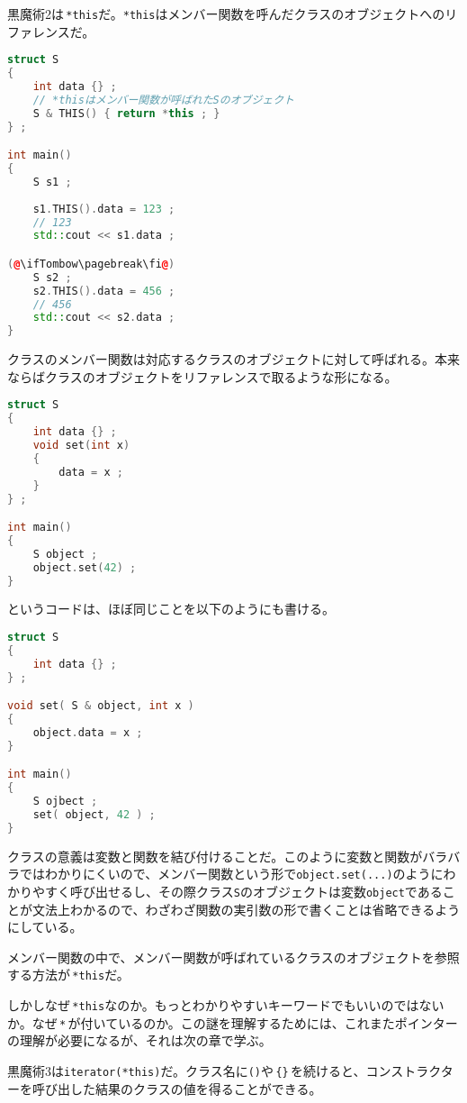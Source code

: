 黒魔術2は\,\texttt{*this}だ。\texttt{*this}はメンバー関数を呼んだクラスのオブジェクトへのリファレンスだ。

\begin{lstlisting}[language={C++}]
struct S
{
    int data {} ;
    // *thisはメンバー関数が呼ばれたSのオブジェクト
    S & THIS() { return *this ; } 
} ;

int main()
{
    S s1 ;
    
    s1.THIS().data = 123 ;
    // 123
    std::cout << s1.data ;

(@\ifTombow\pagebreak\fi@)
    S s2 ;
    s2.THIS().data = 456 ;
    // 456
    std::cout << s2.data ;
}
\end{lstlisting}

クラスのメンバー関数は対応するクラスのオブジェクトに対して呼ばれる。本来ならばクラスのオブジェクトをリファレンスで取るような形になる。

\begin{lstlisting}[language={C++}]
struct S
{
    int data {} ;
    void set(int x)
    {
        data = x ;
    }
} ;

int main()
{
    S object ;
    object.set(42) ;
}
\end{lstlisting}
というコードは、ほぼ同じことを以下のようにも書ける。
\begin{lstlisting}[language={C++}]
struct S
{
    int data {} ;
} ;

void set( S & object, int x )
{
    object.data = x ;
}

int main()
{
    S ojbect ;
    set( object, 42 ) ;
}
\end{lstlisting}

クラスの意義は変数と関数を結び付けることだ。このように変数と関数がバラバラではわかりにくいので、メンバー関数という形で\texttt{object.set(...)}のようにわかりやすく呼び出せるし、その際クラス\texttt{S}のオブジェクトは変数\texttt{object}であることが文法上わかるので、わざわざ関数の実引数の形で書くことは省略できるようにしている。

メンバー関数の中で、メンバー関数が呼ばれているクラスのオブジェクトを参照する方法が\,\texttt{*this}だ。

しかしなぜ\,\texttt{*this}なのか。もっとわかりやすいキーワードでもいいのではないか。なぜ\,\texttt{*}\,が付いているのか。この謎を理解するためには、これまたポインターの理解が必要になるが、それは次の章で学ぶ。

黒魔術3は\texttt{iterator(*this)}だ。クラス名に\texttt{()}や\,\texttt{\{\}}\,を続けると、コンストラクターを呼び出した結果のクラスの値を得ることができる。

